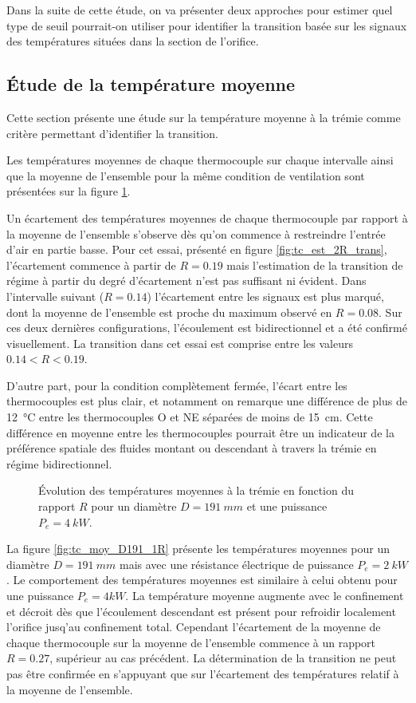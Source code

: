 Dans la suite de cette étude, on va présenter deux approches pour estimer quel type de seuil pourrait-on utiliser pour identifier la transition basée sur les signaux des températures situées dans la section de l'orifice.

\subsection{Étude de la température moyenne}
Cette section présente une étude sur la température moyenne à la trémie comme critère permettant d'identifier la transition.

Les températures moyennes de chaque thermocouple sur chaque intervalle ainsi que la moyenne de l'ensemble pour la même condition de ventilation sont présentées sur la figure \ref{fig:tc_moy_D191_2R}.

Un écartement des températures moyennes de chaque thermocouple par rapport à la moyenne de l'ensemble s'observe dès qu'on commence à restreindre l'entrée d'air en partie basse. Pour cet essai, présenté en figure \ref{fig:tc_est_2R_trans}, l'écartement commence à partir de $R=0.19$ mais l'estimation de la transition de régime à partir du degré d'écartement n'est pas suffisant ni évident. Dans l'intervalle suivant ($R=0.14$) l'écartement entre les signaux est plus marqué, dont la moyenne de l'ensemble est proche du maximum observé en $R=0.08$. Sur ces deux dernières configurations, l'écoulement est bidirectionnel et a été confirmé visuellement. La transition dans cet essai est comprise entre les valeurs $0.14<R<0.19$.

D'autre part, pour la condition complètement fermée, l'écart entre les thermocouples est plus clair, et notamment on remarque une différence de plus de \SI{12}{\celsius} entre les thermocouples O et NE séparées de moins de \SI{15}{cm}. Cette différence en moyenne entre les thermocouples pourrait être un indicateur de la préférence spatiale des fluides montant ou descendant à travers la trémie en régime bidirectionnel.

\begin{figure}
\centering
\resizebox{0.67\textwidth}{!}{}
\caption{Évolution des températures moyennes à la trémie en fonction du rapport $R$ pour un diamètre $D=\SI{191}{mm}$ et une puissance $P_e=\SI{4}{kW}$.}
\label{fig:tc_moy_D191_2R}
\end{figure}

La figure \ref{fig:tc_moy_D191_1R} présente les températures moyennes pour un diamètre $D=\SI{191}{mm}$ mais avec une résistance électrique de puissance $P_e=\SI{2}{kW}$. Le comportement des températures moyennes est similaire à celui obtenu pour une puissance $P_e={4}{kW}$. La température moyenne augmente avec le confinement et décroit dès que l'écoulement descendant est présent pour refroidir localement l'orifice jusq'au confinement total. Cependant l'écartement de la moyenne de chaque thermocouple sur la moyenne de l'ensemble commence à un rapport $R=0.27$, supérieur au cas précédent. La détermination de la transition ne peut pas être confirmée en s'appuyant que sur l'écartement des températures relatif à la moyenne de l'ensemble.

